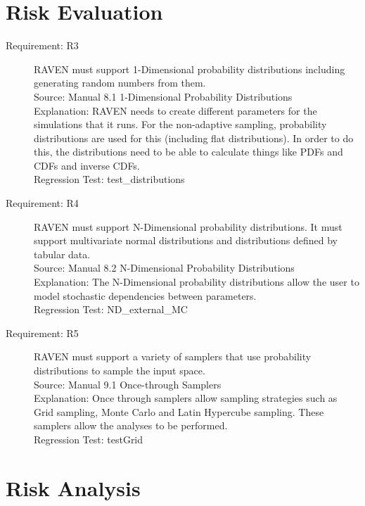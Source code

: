 \documentclass{article}
\newcommand{\requirement}[5]{\item[Requirement: #1] #2 \\Source: #3\\Explanation: #4\\Regression Test: #5}
\begin{document}
\section{Risk Evaluation}

\begin{description}

\requirement{R3}{RAVEN must support 1-Dimensional probability distributions including generating random numbers from them.}
{Manual 8.1 1-Dimensional Probability Distributions}
{RAVEN needs to create different parameters for the simulations that it runs.  For the non-adaptive sampling, probability distributions are used for this (including flat distributions).  In order to do this, the distributions need to be able to calculate things like PDFs and CDFs and inverse CDFs.}
{test\_distributions}

\requirement{R4}{RAVEN must support N-Dimensional probability distributions.  It must support multivariate normal distributions and distributions defined by tabular data.}
{Manual 8.2 N-Dimensional Probability Distributions}
{The N-Dimensional probability distributions allow the user to model stochastic dependencies between parameters.}
{ND\_external\_MC}

\requirement{R5}{RAVEN must support a variety of samplers that use probability distributions to sample the input space.}
{Manual 9.1 Once-through Samplers}
{Once through samplers allow sampling strategies such as Grid sampling, Monte Carlo and Latin Hypercube sampling.  These samplers allow the analyses to be performed.}
{testGrid}

\end{description}

\section{Risk Analysis}
\end{document}
